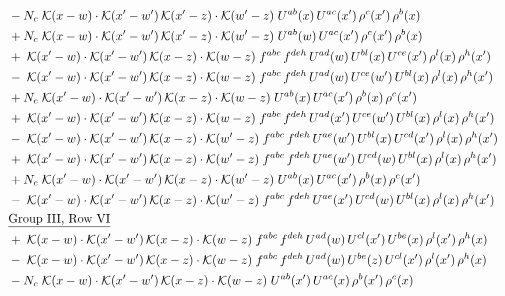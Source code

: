 \documentclass[9pt]{article}
\begin{document}
\begin{align}
&\quad -N_c\;\mathcal{K}(x-w)\cdot\mathcal{K}(x'-w')\,\mathcal{K}(x'-z)\cdot\mathcal{K}(w'-z)\;U^{ab}(x)\,U^{ac}(x')\,\rho^{c}(x')\,\rho^{b}(x)\notag\\
&\quad +N_c\;\mathcal{K}(x-w)\cdot\mathcal{K}(x'-w')\,\mathcal{K}(x'-z)\cdot\mathcal{K}(w'-z)\;U^{ab}(w)\,U^{ac}(x')\,\rho^{c}(x')\,\rho^{b}(x)\notag\\
&\quad +\;\mathcal{K}(x'-w)\cdot\mathcal{K}(x'-w')\,\mathcal{K}(x-z)\cdot\mathcal{K}(w-z)\;f^{abc}\,f^{deh}\,U^{ad}(w)\,U^{bl}(x)\,U^{ce}(x')\,\rho^{l}(x)\,\rho^{h}(x')\notag\\
&\quad -\;\mathcal{K}(x'-w)\cdot\mathcal{K}(x'-w')\,\mathcal{K}(x-z)\cdot\mathcal{K}(w-z)\;f^{abc}\,f^{deh}\,U^{ad}(w)\,U^{ce}(w')\,U^{bl}(x)\,\rho^{l}(x)\,\rho^{h}(x')\notag\\
&\quad +N_c\;\mathcal{K}(x'-w)\cdot\mathcal{K}(x'-w')\,\mathcal{K}(x-z)\cdot\mathcal{K}(w-z)\;U^{ab}(x)\,U^{ac}(x')\,\rho^{b}(x)\,\rho^{c}(x')\notag\\
&\quad +\;\mathcal{K}(x'-w)\cdot\mathcal{K}(x'-w')\,\mathcal{K}(x-z)\cdot\mathcal{K}(w-z)\;f^{abc}\,f^{deh}\,U^{ad}(x')\,U^{ce}(w')\,U^{bl}(x)\,\rho^{l}(x)\,\rho^{h}(x')\notag\\
&\quad -\;\mathcal{K}(x'-w)\cdot\mathcal{K}(x'-w')\,\mathcal{K}(x-z)\cdot\mathcal{K}(w'-z)\;f^{abc}\,f^{deh}\,U^{ae}(w')\,U^{bl}(x)\,U^{cd}(x')\,\rho^{l}(x)\,\rho^{h}(x')\notag\\
&\quad +\;\mathcal{K}(x'-w)\cdot\mathcal{K}(x'-w')\,\mathcal{K}(x-z)\cdot\mathcal{K}(w'-z)\;f^{abc}\,f^{deh}\,U^{ae}(w')\,U^{cd}(w)\,U^{bl}(x)\,\rho^{l}(x)\,\rho^{h}(x')\notag\\
&\quad +N_c\;\mathcal{K}(x'-w)\cdot\mathcal{K}(x'-w')\,\mathcal{K}(x-z)\cdot\mathcal{K}(w'-z)\;U^{ab}(x)\,U^{ac}(x')\,\rho^{b}(x)\,\rho^{c}(x')\notag\\
&\quad -\;\mathcal{K}(x'-w)\cdot\mathcal{K}(x'-w')\,\mathcal{K}(x-z)\cdot\mathcal{K}(w'-z)\;f^{abc}\,f^{deh}\,U^{ae}(x')\,U^{cd}(w)\,U^{bl}(x)\,\rho^{l}(x)\,\rho^{h}(x')\notag\\
&\quad\underline{\text{Group III, Row VI}}\notag\\
&\quad +\;\mathcal{K}(x-w)\cdot\mathcal{K}(x'-w')\,\mathcal{K}(x-z)\cdot\mathcal{K}(w-z)\;f^{abc}\,f^{deh}\,U^{ad}(w)\,U^{cl}(x')\,U^{be}(x)\,\rho^{l}(x')\,\rho^{h}(x)\notag\\
&\quad -\;\mathcal{K}(x-w)\cdot\mathcal{K}(x'-w')\,\mathcal{K}(x-z)\cdot\mathcal{K}(w-z)\;f^{abc}\,f^{deh}\,U^{ad}(w)\,U^{be}(z)\,U^{cl}(x')\,\rho^{l}(x')\,\rho^{h}(x)\notag\\
&\quad -N_c\;\mathcal{K}(x-w)\cdot\mathcal{K}(x'-w')\,\mathcal{K}(x-z)\cdot\mathcal{K}(w-z)\;U^{ab}(x')\,U^{ac}(x)\,\rho^{b}(x')\,\rho^{c}(x)\notag\\

\end{align}
\end{document}

